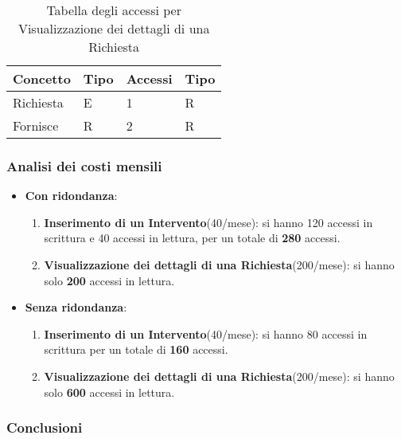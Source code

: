 \documentclass{article}
\begin{document}
\begin{table}[h!]
    \centering
    \begin{adjustbox}{width=0.6\textwidth}
        \begin{tabular}{|m{2cm}|m{2cm}|m{2cm}|m{2cm}|}
            \hline  
            \textbf{Concetto} & \textbf{Tipo} & \textbf{Accessi} & \textbf{Tipo}\\ 
            \hline
            Richiesta & E & 1 & R\\
            \hline
            Fornisce & R & 2 & R\\
            \hline
        \end{tabular}
    \end{adjustbox}
    \caption{Tabella degli accessi per Visualizzazione dei dettagli di una Richiesta}
    \label{tab:accesstable}
\end{table}

\subsubsection{Analisi dei costi mensili}

\begin{itemize}
    \item \textbf{Con ridondanza}:
    \begin{enumerate}
        \item \textbf{Inserimento di un Intervento}(40/mese): si hanno 120 accessi in scrittura e 40 accessi in lettura, per un totale di \textbf{280} accessi.
        \item \textbf{Visualizzazione dei dettagli di una Richiesta}(200/mese): si hanno solo \textbf{200} accessi in lettura.
    \end{enumerate}
    \item \textbf{Senza ridondanza}:
    \begin{enumerate}
        \item \textbf{Inserimento di un Intervento}(40/mese): si hanno 80 accessi in scrittura per un totale di \textbf{160} accessi.
        \item \textbf{Visualizzazione dei dettagli di una Richiesta}(200/mese): si hanno solo \textbf{600} accessi in lettura.
    \end{enumerate}
\end{itemize}

\subsubsection{Conclusioni}
\end{document}
